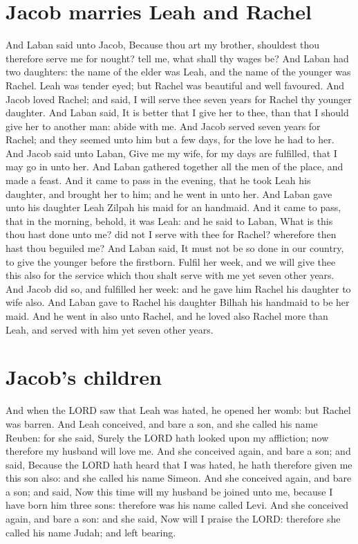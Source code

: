 \begin{biblechapter}
\section*{Jacob marries Leah and Rachel}
\verse And Laban said unto Jacob, Because thou art my brother, shouldest thou therefore serve me for nought? tell me, what shall thy wages be?
\verse And Laban had two daughters: the name of the elder was Leah, and the name of the younger was Rachel.
\verse Leah was tender eyed; but Rachel was beautiful and well favoured.
\verse And Jacob loved Rachel; and said, I will serve thee seven years for Rachel thy younger daughter.
\verse And Laban said, It is better that I give her to thee, than that I should give her to another man: abide with me.
\verse And Jacob served seven years for Rachel; and they seemed unto him but a few days, for the love he had to her.
\verse And Jacob said unto Laban, Give me my wife, for my days are fulfilled, that I may go in unto her.
\verse And Laban gathered together all the men of the place, and made a feast.
\verse And it came to pass in the evening, that he took Leah his daughter, and brought her to him; and he went in unto her.
\verse And Laban gave unto his daughter Leah Zilpah his maid for an handmaid.
\verse And it came to pass, that in the morning, behold, it was Leah: and he said to Laban, What is this thou hast done unto me? did not I serve with thee for Rachel? wherefore then hast thou beguiled me?
\verse And Laban said, It must not be so done in our country, to give the younger before the firstborn.
\verse Fulfil her week, and we will give thee this also for the service which thou shalt serve with me yet seven other years.
\verse And Jacob did so, and fulfilled her week: and he gave him Rachel his daughter to wife also.
\verse And Laban gave to Rachel his daughter Bilhah his handmaid to be her maid.
\verse And he went in also unto Rachel, and he loved also Rachel more than Leah, and served with him yet seven other years.
\section*{Jacob's children}
\verse And when the LORD saw that Leah was hated, he opened her womb: but Rachel was barren.
\verse And Leah conceived, and bare a son, and she called his name Reuben: for she said, Surely the LORD hath looked upon my affliction; now therefore my husband will love me.
\verse And she conceived again, and bare a son; and said, Because the LORD hath heard that I was hated, he hath therefore given me this son also: and she called his name Simeon.
\verse And she conceived again, and bare a son; and said, Now this time will my husband be joined unto me, because I have born him three sons: therefore was his name called Levi.
\verse And she conceived again, and bare a son: and she said, Now will I praise the LORD: therefore she called his name Judah; and left bearing.
\end{biblechapter}

